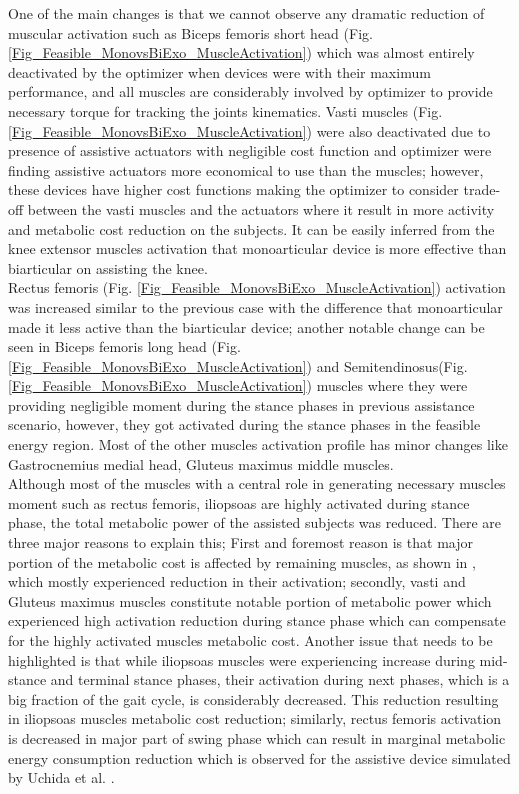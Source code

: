 \documentclass[10pt,letterpaper]{article}
\begin{document}
One of the main changes is that we cannot observe any dramatic reduction of muscular activation such as Biceps femoris short head (Fig. \ref{Fig_Feasible_MonovsBiExo_MuscleActivation}) which was almost entirely deactivated by the optimizer when devices were with their maximum performance, and all muscles are considerably involved by optimizer to provide necessary torque for tracking the joints kinematics.
Vasti muscles (Fig. \ref{Fig_Feasible_MonovsBiExo_MuscleActivation}) were also deactivated due to presence of assistive actuators with negligible cost function and optimizer were finding assistive actuators more economical to use than the muscles; however, these devices have higher cost functions making the optimizer to consider trade-off between the vasti muscles and the actuators where it result in more activity and metabolic cost reduction on the subjects. It can be easily inferred from the knee extensor muscles activation that monoarticular device is more effective than biarticular on assisting the knee.\\
Rectus femoris (Fig. \ref{Fig_Feasible_MonovsBiExo_MuscleActivation}) activation was increased similar to the previous case with the difference that monoarticular made it less active than the biarticular device; another notable change can be seen in Biceps femoris long head (Fig. \ref{Fig_Feasible_MonovsBiExo_MuscleActivation}) and Semitendinosus(Fig. \ref{Fig_Feasible_MonovsBiExo_MuscleActivation}) muscles where they were providing negligible moment during the stance phases in previous assistance scenario, however, they got activated during the stance phases in the feasible energy region. Most of the other muscles activation profile has minor changes like Gastrocnemius medial head, Gluteus maximus middle muscles.\\
Although most of the muscles with a central role in generating necessary muscles moment such as rectus femoris, iliopsoas are highly activated during stance phase, the total metabolic power of the assisted subjects was reduced. There are three major reasons to explain this; First and foremost reason is that  major portion of the metabolic cost is affected by remaining muscles, as shown in \cite{2}, which mostly experienced reduction in their activation; secondly, vasti and Gluteus maximus muscles constitute notable portion of metabolic power which experienced high activation reduction during stance phase which can compensate for the highly activated muscles metabolic cost. Another issue that needs to be highlighted is that while iliopsoas muscles were experiencing increase during mid-stance and terminal stance phases, their activation during next phases, which is a big fraction of the gait cycle, is considerably decreased. This reduction resulting in iliopsoas muscles metabolic cost reduction; similarly, rectus femoris activation is decreased in major part of swing phase which can result in marginal metabolic energy consumption reduction which is observed for the assistive device simulated by Uchida et al. \cite{2}.
\end{document}
